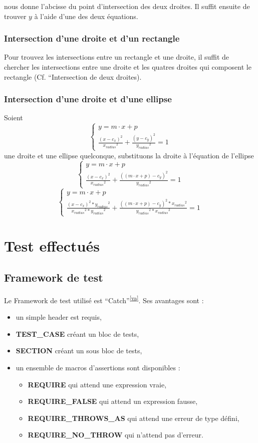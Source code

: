 \documentclass[a4paper,11pt]{report}
\begin{document}
nous donne l'abcisse du point d'intersection des deux droites.
Il suffit ensuite de trouver $y$ à l'aide d'une des deux équations.

\subsection[Droite et rectangle]{Intersection d'une droite et d'un rectangle}
Pour trouvez les intersections entre un rectangle et une droite, il suffit de
chercher les intersections entre une droite et les quatres droites qui composent
le rectangle (Cf. ``Intersection de deux droites).

\subsection[Droite et ellipse]{Intersection d'une droite et d'une ellipse}
Soient \\
$$\begin{cases}
	y = m \cdot x + p \\
	\frac{(x - c_x)^2}{{x_{radius}}^2} + \frac{(y - c_y)^2}{{y_{radius}}^2} = 1
\end{cases}$$
une droite et une ellipse quelconque, substituons la droite à l'équation de
l'ellipse
$$\begin{cases}
	y = m \cdot x + p \\
	\frac{(x - c_x)^2}{{x_{radius}}^2} + \frac{((m \cdot x + p) - c_y)^2}{{y_{radius}}^2} = 1
\end{cases}$$
$$\begin{cases}
	y = m \cdot x + p \\
	\frac{(x - c_x)^2 * {y_{radius}}^2}{{x_{radius}}^2 * {y_{radius}}^2} +
	\frac{((m \cdot x + p) - c_y)^2 * {x_{radius}}^2}{{y_{radius}}^2 * {x_{radius}}^2} = 1
\end{cases}$$


\chapter{Test effectués}
\section{Framework de test}
Le Framework de test utilisé est
``Catch''\textsuperscript{\ref{va}}. Ses avantages
sont :
\begin{itemize}
	\item un simple header est requis,
	\item \textbf{TEST\_CASE} créant un bloc de tests,
	\item \textbf{SECTION} créant un sous bloc de tests,
	\item un ensemble de macros d'assertions sont disponibles :
		\begin{itemize}
			\item\textbf{REQUIRE} qui attend une expression vraie,
			\item\textbf{REQUIRE\_FALSE} qui attend un expression fausse,
			\item\textbf{REQUIRE\_THROWS\_AS} qui attend une erreur de type défini,
			\item\textbf{REQUIRE\_NO\_THROW} qui n'attend pas d'erreur.
		\end{itemize}
\end{itemize} 
\end{document}
